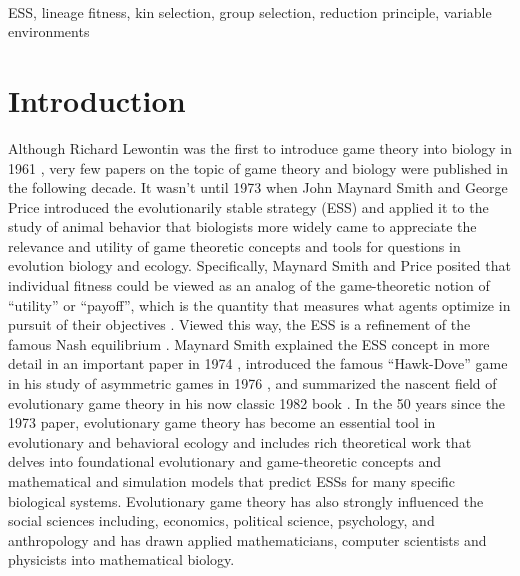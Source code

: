 \documentclass[11pt]{article}
\begin{document}
\vspace{3em}
\\
ESS, lineage fitness, kin selection, group selection, reduction principle, variable environments

\clearpage
\section{Introduction}

Although Richard Lewontin was the first to introduce game theory into biology in 1961 \cite{Lewontin:1961}, very few papers on the topic of game theory and biology were published in the following decade. It wasn't until 1973 when John Maynard Smith and George Price introduced the evolutionarily stable strategy (ESS) and applied it to the study of animal behavior \cite{Maynard-Smith:Price:1973} that biologists more widely came to appreciate the relevance and utility of game theoretic concepts and tools for questions in evolution biology and ecology. Specifically, Maynard Smith and Price posited that individual fitness could be viewed as an analog of the game-theoretic notion of ``utility'' or ``payoff'', which is the quantity that measures what agents optimize in pursuit of their objectives \cite{Myerson:1991}. Viewed this way, the ESS is a refinement of the famous Nash equilibrium \cite{Nash:1950}. Maynard Smith explained the ESS concept in more detail in an important paper in 1974 \cite{Maynard-Smith:1974}, introduced the famous ``Hawk-Dove'' game in his study of asymmetric games in 1976 \cite{Maynard-Smith:Parker:1976}, and summarized the nascent field of evolutionary game theory in his now classic 1982 book \cite{MaynardSmith:1982}. In the 50 years since the 1973 paper, evolutionary game theory has become an essential tool in evolutionary and behavioral ecology and includes rich theoretical work that delves into foundational evolutionary and game-theoretic concepts and mathematical and simulation models that predict ESSs for many specific biological systems. Evolutionary game theory has also strongly influenced the social sciences including, economics, political science, psychology, and anthropology and has drawn applied mathematicians, computer scientists and physicists into mathematical biology.
\end{document}
